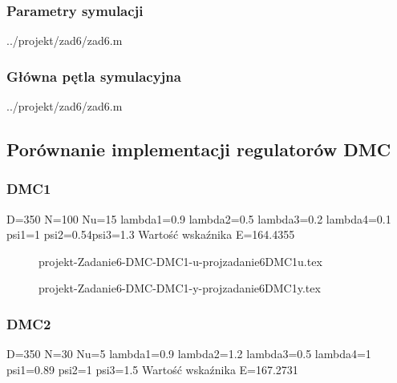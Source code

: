 \subsubsection{Parametry symulacji}

\ifdefined\CompileListings
    
        {../projekt/zad6/zad6.m}
    \newpage
\fi

\subsubsection{Główna pętla symulacyjna}

\ifdefined\CompileListings
    
        {../projekt/zad6/zad6.m}
\fi
\newpage

\subsection{Porównanie implementacji regulatorów DMC}
\subsubsection{DMC1}
D=350 N=100 Nu=15 
lambda1=0.9 lambda2=0.5 lambda3=0.2 lambda4=0.1 
psi1=1 psi2=0.54psi3=1.3 
Wartość wskaźnika E=164.4355


\ifdefined\CompileFigures
    \begin{figure}[H] 
            \centering
            
            \caption{projekt-Zadanie6-DMC-DMC1-u-projzadanie6DMC1u.tex}
            \label{projekt:zad6:figure:projzadanie6DMC1u}
    \end{figure}
\fi


\ifdefined\CompileFigures
    \begin{figure}[H] 
            \centering
            
            \caption{projekt-Zadanie6-DMC-DMC1-y-projzadanie6DMC1y.tex}
            \label{projekt:zad6:figure:projzadanie6DMC1y}
    \end{figure}
\fi

\subsubsection{DMC2}
D=350 N=30 Nu=5 
lambda1=0.9 lambda2=1.2 lambda3=0.5 lambda4=1 
psi1=0.89 psi2=1 psi3=1.5 
Wartość wskaźnika E=167.2731


